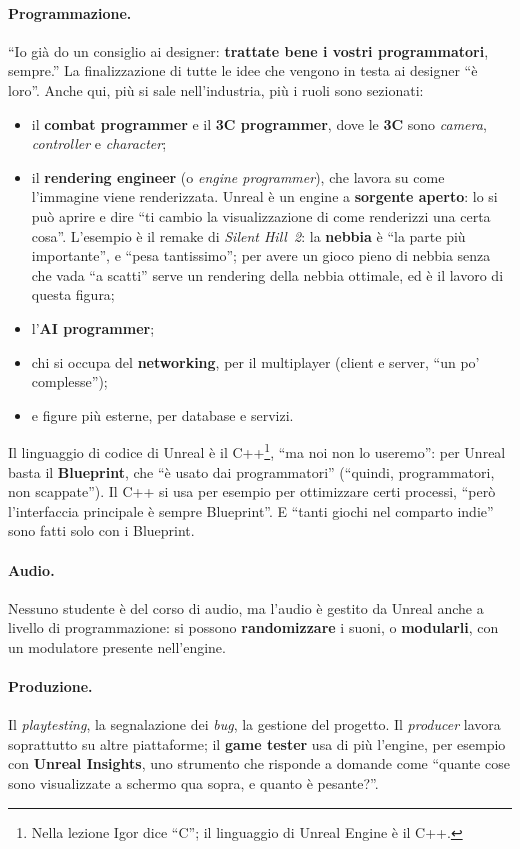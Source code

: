 \paragraph{Programmazione.} ``Io già do un consiglio ai designer: \textbf{trattate bene i
vostri programmatori}, sempre.'' La finalizzazione di tutte le idee che vengono in testa
ai designer ``è loro''. Anche qui, più si sale nell'industria, più i ruoli sono
sezionati:
\begin{itemize}
  \item il \textbf{combat programmer} e il \textbf{3C programmer}, dove le
        \textbf{3C} sono \emph{camera}, \emph{controller} e \emph{character};
  \item il \textbf{rendering engineer} (o \emph{engine programmer}), che lavora su come
        l'immagine viene renderizzata. Unreal è un engine a \textbf{sorgente aperto}:
        lo si può aprire e dire ``ti cambio la visualizzazione di come renderizzi una
        certa cosa''. L'esempio è il remake di \emph{Silent Hill~2}: la
        \textbf{nebbia} è ``la parte più importante'', e ``pesa tantissimo''; per
        avere un gioco pieno di nebbia senza che vada ``a scatti'' serve un rendering
        della nebbia ottimale, ed è il lavoro di questa figura;
  \item l'\textbf{AI programmer};
  \item chi si occupa del \textbf{networking}, per il multiplayer (client e server, ``un
        po' complesse'');
  \item e figure più esterne, per database e servizi.
\end{itemize}
Il linguaggio di codice di Unreal è il C++\footnote{Nella lezione Igor dice ``C'';
il linguaggio di Unreal Engine è il C++.}, ``ma noi non lo useremo'': per Unreal basta il
\textbf{Blueprint}, che ``è usato dai programmatori'' (``quindi, programmatori, non
scappate''). Il C++ si usa per esempio per ottimizzare certi processi, ``però
l'interfaccia principale è sempre Blueprint''. E ``tanti giochi nel comparto indie''
sono fatti solo con i Blueprint.

\paragraph{Audio.} Nessuno studente è del corso di audio, ma l'audio è gestito da Unreal
anche a livello di programmazione: si possono \textbf{randomizzare} i suoni, o
\textbf{modularli}, con un modulatore presente nell'engine.

\paragraph{Produzione.} Il \emph{playtesting}, la segnalazione dei \emph{bug}, la
gestione del progetto. Il \emph{producer} lavora soprattutto su altre piattaforme; il
\textbf{game tester} usa di più l'engine, per esempio con \textbf{Unreal Insights}, uno
strumento che risponde a domande come ``quante cose sono visualizzate a schermo qua
sopra, e quanto è pesante?''.

